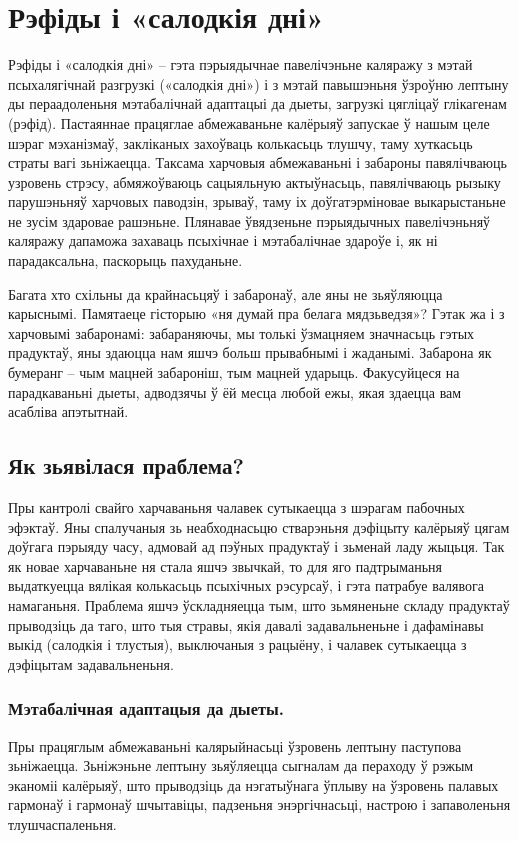 \chapter{Рэфіды і «салодкія дні»}

Рэфіды і «салодкія дні» – гэта пэрыядычнае павелічэньне каляражу з мэтай псыхалягічнай разгрузкі («салодкія дні») і з мэтай павышэньня ўзроўню лептыну ды пераадоленьня мэтабалічнай адаптацыі да дыеты, загрузкі цягліцаў глікагенам (рэфід). Пастаяннае працяглае абмежаваньне калёрыяў запускае ў нашым целе шэраг мэханізмаў, закліканых захоўваць колькасьць тлушчу, таму хуткасьць страты вагі зьніжаецца. Таксама харчовыя абмежаваньні і забароны павялічваюць узровень стрэсу, абмяжоўваюць сацыяльную актыўнасьць, павялічваюць рызыку парушэньняў харчовых паводзін, зрываў, таму іх доўгатэрміновае выкарыстаньне не зусім здаровае рашэньне. Плянавае ўвядзеньне пэрыядычных павелічэньняў каляражу дапаможа захаваць псыхічнае і мэтабалічнае здароўе і, як ні парадаксальна, паскорыць пахуданьне.

Багата хто схільны да крайнасьцяў і забаронаў, але яны не зьяўляюцца карыснымі. Памятаеце гісторыю «ня думай пра белага мядзьведзя»? Гэтак жа і з харчовымі забаронамі: забараняючы, мы толькі ўзмацняем значнасьць гэтых прадуктаў, яны здаюцца нам яшчэ больш прывабнымі і жаданымі. Забарона як бумеранг – чым мацней забароніш, тым мацней ударыць. Факусуйцеся на парадкаваньні дыеты, адводзячы ў ёй месца любой ежы, якая здаецца вам асабліва апэтытнай.

\section{Як зьявілася праблема?}

Пры кантролі свайго харчаваньня чалавек сутыкаецца з шэрагам пабочных эфэктаў. Яны спалучаныя зь неабходнасьцю стварэньня дэфіцыту калёрыяў цягам доўгага пэрыяду часу, адмовай ад пэўных прадуктаў і зьменай ладу жыцьця. Так як новае харчаваньне ня стала яшчэ звычкай, то для яго падтрыманьня выдаткуецца вялікая колькасьць псыхічных рэсурсаў, і гэта патрабуе валявога намаганьня. Праблема яшчэ ўскладняецца тым, што зьмяненьне складу прадуктаў прыводзіць да таго, што тыя стравы, якія давалі задавальненьне і дафамінавы выкід (салодкія і тлустыя), выключаныя з рацыёну, і чалавек сутыкаецца з дэфіцытам задавальненьня.

\subsection{Мэтабалічная адаптацыя да дыеты.}
Пры працяглым абмежаваньні калярыйнасьці ўзровень лептыну паступова зьніжаецца. Зьніжэньне лептыну зьяўляецца сыгналам да пераходу ў рэжым эканоміі калёрыяў, што прыводзіць да нэгатыўнага ўплыву на ўзровень палавых гармонаў і гармонаў шчытавіцы, падзеньня энэргічнасьці, настрою і запаволеньня тлушчаспаленьня.

